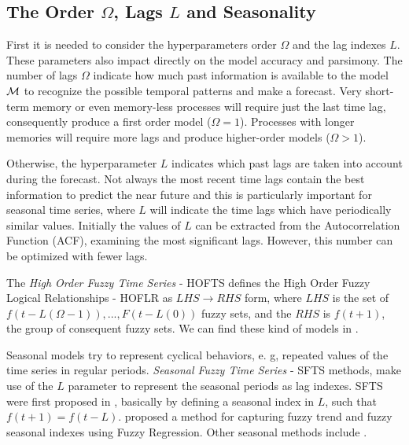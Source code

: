 %
\subsection{The Order $\Omega$, Lags $L$ and Seasonality}
\label{sec:fts_order}\index{$\Omega$}

First it is needed to consider the hyperparameters order $\Omega$ and the lag indexes $L$. These parameters also impact directly on the model accuracy and parsimony. The number of lags $\Omega$ indicate how much past information is available to the model $\mathcal{M}$ to recognize the possible temporal patterns and make a forecast. Very short-term memory or even memory-less processes will require just the last time lag, consequently produce a first order model ($\Omega = 1$). Processes with longer memories will require more lags and produce higher-order models ($\Omega>1$). 

Otherwise, the hyperparameter $L$ indicates which past lags are taken into account during the forecast. Not always the most recent time lags contain the best information to predict the near future and this is particularly important for seasonal time series, where $L$ will indicate the time lags which have periodically similar values. Initially the values of $L$ can be extracted from the Autocorrelation Function (ACF), examining the most significant lags. However, this number can be optimized with fewer lags.


The \textit{High Order Fuzzy Time Series} - HOFTS  defines the High Order Fuzzy Logical Relationships - HOFLR as $LHS \rightarrow RHS$ form, where $LHS$ is the set of $f(t-L(\Omega-1)), ..., F(t - L(0))$ fuzzy sets, and the $RHS$ is $f(t+1)$, the group of consequent fuzzy sets. We can find these kind of models in \cite{Chen2002, Chen2006a, Jilani2008a, Li2008b, Egrioglu2010, Bahrepour2011, Enayatifar2013, Chen2014, Chen2015a, Ye2016, Lee2017, Bose2017, Sadaei2017, Guney2018, Cheng2018, Yang2018, Zhang2018a}.


Seasonal models try to represent cyclical behaviors, e. g, repeated values of the time series in regular periods. \textit{Seasonal Fuzzy Time Series} - SFTS methods, make use of the $L$ parameter to represent the seasonal periods as lag indexes. SFTS were first proposed  in \cite{Song1997}, basically by defining a seasonal index in $L$, such that $f(t+1) = f(t-L)$. \cite{Chang1997} proposed a method for capturing fuzzy trend and fuzzy seasonal indexes using Fuzzy Regression. Other seasonal methods include \cite{Tseng1999, Song1999, Lee2011}. 

